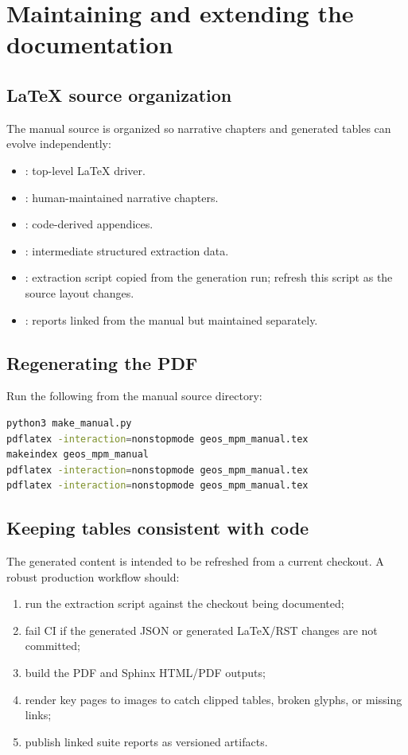 \chapter{Maintaining and extending the documentation}
\label{ch:maintaining}

\section{LaTeX source organization}
The manual source is organized so narrative chapters and generated tables can evolve independently:
\begin{itemize}[leftmargin=*]
\item {}: top-level LaTeX driver.
\item {}: human-maintained narrative chapters.
\item {}: code-derived appendices.
\item {}: intermediate structured extraction data.
\item {}: extraction script copied from the generation run; refresh this script as the source layout changes.
\item {}: reports linked from the manual but maintained separately.
\end{itemize}

\section{Regenerating the PDF}
Run the following from the manual source directory:
\begin{lstlisting}[language=bash,caption={Manual build commands.}]
python3 make_manual.py
pdflatex -interaction=nonstopmode geos_mpm_manual.tex
makeindex geos_mpm_manual
pdflatex -interaction=nonstopmode geos_mpm_manual.tex
pdflatex -interaction=nonstopmode geos_mpm_manual.tex
\end{lstlisting}

\section{Keeping tables consistent with code}
The generated content is intended to be refreshed from a current checkout.  A robust production workflow should:
\begin{enumerate}[leftmargin=*]
\item run the extraction script against the checkout being documented;
\item fail CI if the generated JSON or generated \LaTeX/RST changes are not committed;
\item build the PDF and Sphinx HTML/PDF outputs;
\item render key pages to images to catch clipped tables, broken glyphs, or missing links;
\item publish linked suite reports as versioned artifacts.
\end{enumerate}

